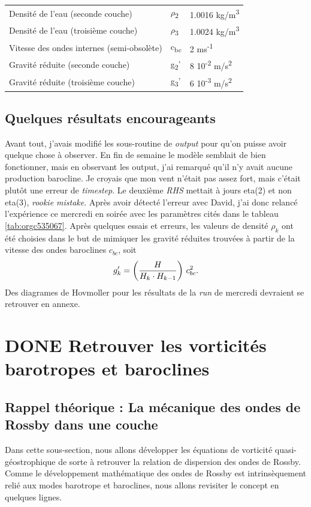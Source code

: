 \documentclass[10pt]{report}
\numberwithin{equation}{section}
\begin{document}
\begin{table}[htbp]
\begin{tabular}{lll}
Densité de l'eau (seconde couche) & \(\rho\)\textsubscript{2} & 1.0016 kg/m\textsuperscript{3}\\[0pt]
Densité de l'eau (troisième couche) & \(\rho\)\textsubscript{3} & 1.0024 kg/m\textsuperscript{3}\\[0pt]
Vitesse des ondes internes (semi-obsolète) & c\textsubscript{bc} & 2 ms\textsuperscript{-1}\\[0pt]
Gravité réduite (seconde couche) & g\textsubscript{2}' & 8 \texttimes{} 10\textsuperscript{-2} m/s\textsuperscript{2}\\[0pt]
Gravité réduite (troisième couche) & g\textsubscript{3}' & 6 \texttimes{} 10\textsuperscript{-3} m/s\textsuperscript{2}\\[0pt]
\hline
\hline
\end{tabular}
\end{table}

\subsection{Quelques résultats encourageants}
\label{sec:org088846f}
Avant tout, j'avais modifié les sous-routine de \emph{output} pour qu'on puisse avoir quelque chose à observer.
En fin de semaine le modèle semblait de bien fonctionner, mais en observant les output, j'ai remarqué qu'il n'y avait aucune production barocline.
Je croyais que mon vent n'était pas assez fort, mais c'était plutôt une erreur de \emph{timestep}.
Le deuxième \emph{RHS} mettait à jours eta(2) et non eta(3), \emph{rookie mistake}.
Après avoir détecté l'erreur avec David, j'ai donc relancé l'expérience ce mercredi en soirée avec les paramètres cités dans le tableau \ref{tab:orgc535067}.
Après quelques essais et erreurs, les valeurs de densité \(\rho_k\) ont été choisies dans le but de mimiquer les gravité réduites trouvées à partir de la vitesse des ondes baroclines \(c_{bc}\), soit
\begin{equation}
g_k' = \qty(\frac{H}{H_k\cdot H_{k-1}}) \ c_{bc}^2.
\end{equation}
Des diagrames de Hovmoller pour les résultats de la \emph{run} de mercredi devraient se retrouver en annexe.

\section{{\bfseries\sffamily DONE} Retrouver les vorticités barotropes et baroclines}
\label{sec:org5241477}
\subsection{\textbf{Rappel théorique} :  La mécanique des ondes de Rossby dans une couche}
\label{sec:org116bfea}
Dans cette sous-section, nous allons développer les équations de vorticité quasi-géostrophique de sorte à retrouver la relation de dispersion des ondes de Rossby.
Comme le développement mathématique des ondes de Rossby est intrinsèquement relié aux modes barotrope et baroclines, nous allons revisiter le concept en quelques lignes.\bigskip
\end{document}
